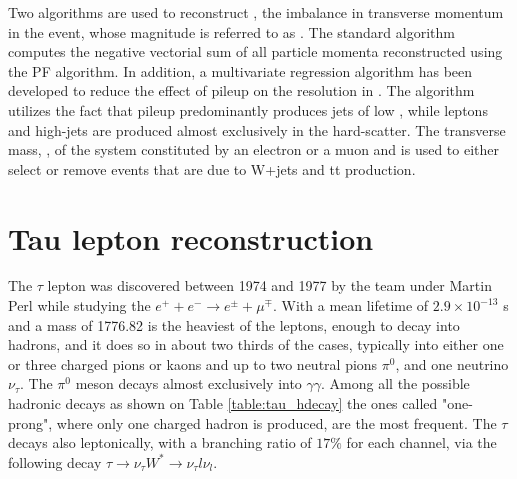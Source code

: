 
Two algorithms are used to reconstruct \ptvecmiss, the imbalance in transverse momentum in the event, whose magnitude is referred to as \met. The standard algorithm computes the negative vectorial sum of all particle momenta reconstructed using the PF algorithm. In addition, a multivariate regression algorithm \cite{Khachatryan:2014gga} has been developed to reduce the effect of pileup on the resolution in \met. The algorithm utilizes the fact that pileup predominantly produces jets of low \pt, while leptons and high-\pt jets are produced almost exclusively in the hard-scatter. The transverse mass, \mt, of the system constituted by an electron or a muon and \met is used to either select or remove events that are due to W+jets and tt production. 

\clearpage

\section {Tau lepton reconstruction}

The $\tau$ lepton was discovered between 1974 and 1977 by the team under Martin Perl while studying the $e^{+}+e^{-}\longrightarrow e^{\pm}+\mu^{\mp}$. With a mean lifetime of $2.9\times10^{−13}$ s and a mass of 1776.82 \mev \cite{Agashe:2014kda} is the heaviest of the leptons, enough to decay into hadrons, and it does so in about two thirds of the cases, typically into either one or three charged pions or kaons and up to two neutral pions \ensuremath{\pi^{0}}, and one neutrino \ensuremath{\nu_{\tau}}. The \ensuremath{\pi^{0}} meson decays almost exclusively into \ensuremath{\gamma\gamma}. Among all the possible hadronic decays as shown on Table \ref{table:tau_hdecay} the ones called "one-prong", where only one charged hadron is produced, are the most frequent. The $\tau$ decays also leptonically, with a branching ratio of $17\%$ for each channel, via the following decay $\tau\longrightarrow\nu_{\tau}W^{*}\longrightarrow\nu_{\tau}l\nu_{l}$.

